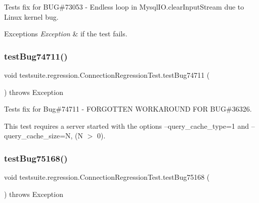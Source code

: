 Tests fix for B\+UG\#73053 -\/ Endless loop in Mysql\+I\+O.\+clear\+Input\+Stream due to Linux kernel bug.


\begin{DoxyExceptions}{Exceptions}
{\em Exception} & if the test fails. \\
\hline
\end{DoxyExceptions}
\mbox{\label{classtestsuite_1_1regression_1_1_connection_regression_test_a9c03aad693cf9263c8523b7d3c65f223}} 
\subsubsection{\texorpdfstring{test\+Bug74711()}{testBug74711()}}
{\footnotesize\ttfamily void testsuite.\+regression.\+Connection\+Regression\+Test.\+test\+Bug74711 (\begin{DoxyParamCaption}{ }\end{DoxyParamCaption}) throws Exception}

Tests fix for Bug\#74711 -\/ F\+O\+R\+G\+O\+T\+T\+EN W\+O\+R\+K\+A\+R\+O\+U\+ND F\+OR B\+UG\#36326.

This test requires a server started with the options \textquotesingle{}--query\+\_\+cache\+\_\+type=1\textquotesingle{} and \textquotesingle{}--query\+\_\+cache\+\_\+size=N\textquotesingle{}, (N $>$ 0). \mbox{\label{classtestsuite_1_1regression_1_1_connection_regression_test_a481102d0bf994ee0a48b67f1a1328c43}} 
\subsubsection{\texorpdfstring{test\+Bug75168()}{testBug75168()}}
{\footnotesize\ttfamily void testsuite.\+regression.\+Connection\+Regression\+Test.\+test\+Bug75168 (\begin{DoxyParamCaption}{ }\end{DoxyParamCaption}) throws Exception}

